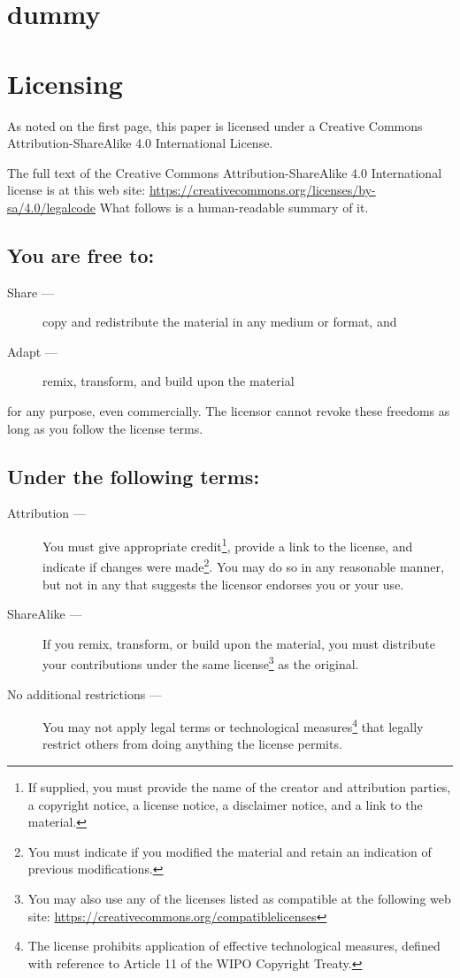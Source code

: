 \documentclass[letterpaper,twoside]{article}
\begin{document}
\section{dummy}
\citep{Stephenson20160404}

\section{Licensing}
\label{section:Licensing}
As noted on the first page, this paper is licensed under a Creative
Commons Attribution-ShareAlike 4.0 International License.

The full text of the Creative Commons Attribution-ShareAlike 4.0
International license is at this web site:
\href{https://creativecommons.org/licenses/by-sa/4.0/legalcode}{https://creativecommons.org/licenses/by-sa/4.0/legalcode}%
What follows is a human-readable summary of it.

\subsection{You are free to:}
\begin{description}
\item[Share ---]copy and redistribute the material in any medium or format, and
\item[Adapt ---]remix, transform, and build upon the material
\end{description}
for any purpose, even commercially.  The licensor cannot revoke these
freedoms as long as you follow the license terms.
\subsection{Under the following terms:}
\begin{description}
\item[Attribution ---]You must give appropriate credit\footnote{If supplied,
  you must provide the name of the creator and attribution parties,
  a copyright notice, a license notice, a disclaimer notice, and a link
  to the material.}, provide a link to
  the license, and indicate if changes were made\footnote{You must indicate if
    you modified the material and retain an indication of previous
    modifications.}.  You may do so in any
  reasonable manner, but not in any that suggests the licensor endorses you
  or your use.
\item[ShareAlike ---]If you remix, transform, or build upon the material,
  you must distribute your contributions under the same
  license\footnote{You may also use any of the licenses listed as compatible
    at the following web site:
    \href{https://creativecommons.org/compatiblelicenses}{https://creativecommons.org/compatiblelicenses}}
  as the original.
\item[No additional restrictions ---]You may not apply legal terms or
  technological measures\footnote{The license prohibits application of
    effective technological measures, defined with reference to Article 11
    of the WIPO Copyright Treaty.}
  that legally restrict others from doing anything
  the license permits.
\end{description}
\end{document}
